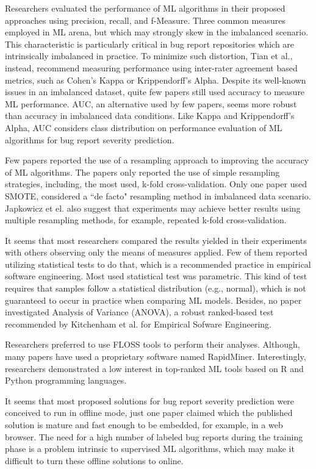 Researchers evaluated the performance of ML algorithms in their proposed approaches using precision, recall, and f-Measure. Three common measures employed in ML arena, but which may strongly skew in the imbalanced scenario\cite{Jeni:2013}. This characteristic is particularly critical in bug report repositories which are intrinsically imbalanced in practice\cite{Roy:2017}. To minimize such distortion, Tian et al.\cite{Tian:2016}, instead, recommend measuring performance using inter-rater agreement based metrics, such as Cohen's Kappa\cite{Ben-David:2008} or Krippendorff's Alpha\cite{Krippendorff:2011}. Despite its well-known issues in an imbalanced dataset\cite{Japkowicz:2011}, quite few papers still used accuracy to measure ML performance. AUC, an alternative used by few papers, seems more robust than accuracy in imbalanced data conditions. Like Kappa and Krippendorff's Alpha, AUC considers class distribution on performance evaluation of ML algorithms for bug report severity prediction.


Few papers reported the use of a resampling approach to improving the accuracy of ML algorithms. The papers only reported the use of simple resampling strategies, including, the most used, k-fold cross-validation. Only one paper used SMOTE, considered a ``de facto" resampling method in imbalanced data scenario\cite{Fernandez:2018}. Japkowicz et el.\cite{Japkowicz:2011} also suggest that experiments may achieve better results using multiple resampling methods, for example, repeated k-fold cross-validation.

It seems that most researchers compared the results yielded in their experiments with others observing only the means of measures applied. Few of them reported utilizing statistical tests to do that, which is a recommended practice in empirical software engineering\cite{Kitchenham:2017}. Most used statistical test was parametric.  This kind of test requires that samples follow a statistical distribution (e.g., normal), which is not guaranteed to occur in practice when comparing ML models\cite{Facelli:2015}. Besides, no paper investigated Analysis of Variance (ANOVA), a robust ranked-based test recommended by Kitchenham et al.\cite{Kitchenham:2017} for Empirical Sofware Engineering. 

Researchers preferred to use FLOSS tools to perform their analyses. Although, many papers have used a proprietary software named RapidMiner. Interestingly, researchers demonstrated a low interest in top-ranked ML tools based on R and Python programming languages.

It seems that most proposed solutions for bug report severity prediction were conceived to run in offline mode, just one paper claimed which the published solution is mature and fast enough to be embedded, for example, in a web browser. The need for a high number of labeled bug reports during the training phase\cite{Nigam:2012} is a problem intrinsic to supervised ML algorithms, which may make it difficult to turn these offline solutions to online. 